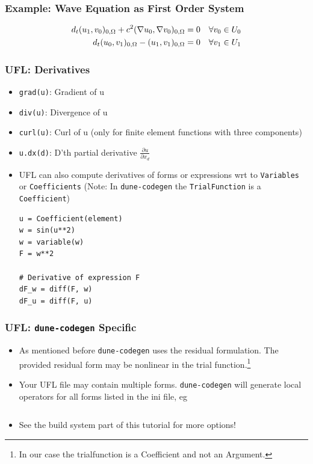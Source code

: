 \documentclass[aspectratio=169,11pt]{beamer}
\theoremstyle{definition}
\begin{document}
\begin{frame}[fragile]
  \frametitle{Example: Wave Equation as First Order System}

  \begin{align*}
    d_t (u_1,v_0)_{0,\Omega} + c^2 (\nabla u_0, \nabla v_0)_{0,\Omega}
    &= 0 \quad \forall v_0 \in U_0 \notag \\
    d_t (u_0,v_1)_{0,\Omega} - (u_1,v_1)_{0,\Omega}
    &= 0 \quad \forall v_1 \in U_1
  \end{align*}

  
\end{frame}

\begin{frame}[fragile]
  \frametitle{UFL: Derivatives}
  \begin{itemize}
  \item \lstinline{grad(u)}: Gradient of u
  \item \lstinline{div(u)}: Divergence of u
  \item \lstinline{curl(u)}: Curl of u (only for finite element functions with
    three components)
  \item \lstinline{u.dx(d)}: D'th partial derivative $\frac{\partial u}{\partial x_d}$
  \item UFL can also compute derivatives of forms or expressions wrt to
    \lstinline{Variables} or \lstinline{Coefficients} (Note: In
    \lstinline{dune-codegen} the \lstinline{TrialFunction} is a
    \lstinline{Coefficient})
    \begin{lstlisting}[basicstyle=\scriptsize, backgroundcolor=\color{listingbg}]
u = Coefficient(element)
w = sin(u**2)
w = variable(w)
F = w**2

# Derivative of expression F
dF_w = diff(F, w)
dF_u = diff(F, u)
    \end{lstlisting}
  \end{itemize}
\end{frame}

\begin{frame}[fragile]
  \frametitle{UFL: \lstinline{dune-codegen} Specific}
  \begin{itemize}
  \item As mentioned before \lstinline{dune-codegen} uses the residual
    formulation. The provided residual form may be nonlinear in the trial
    function.\footnote{In our case the trialfunction is a Coefficient and not
      an Argument.}
  \item Your UFL file may contain multiple forms. \lstinline{dune-codegen} will
    generate local operators for all forms listed in the ini file, eg
    \inputminted[fontsize=\small, firstline=12, lastline=13]{ini}{../src/heatequation.ini}
  \item See the build system part of this tutorial for more options!
  \end{itemize}
\end{frame}
\end{document}
